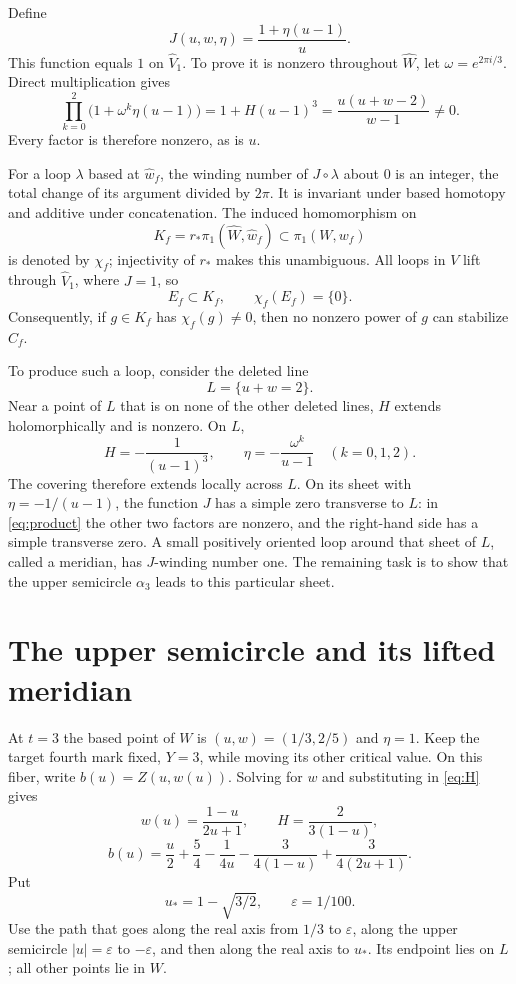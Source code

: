 \documentclass[11pt]{article}
\theoremstyle{remark}
\begin{document}
Define
\begin{equation}\label{eq:J}
 J(u,w,\eta)=\frac{1+\eta(u-1)}u.
\end{equation}
This function equals $1$ on $\widehat V_1$. To prove it is nonzero throughout $\widehat W$, let $\omega=e^{2\pi i/3}$. Direct multiplication gives
\begin{equation}\label{eq:product}
 \prod_{k=0}^2\bigl(1+\omega^k\eta(u-1)\bigr)
 =1+H(u-1)^3=\frac{u(u+w-2)}{w-1}\ne0.
\end{equation}
Every factor is therefore nonzero, as is $u$.

For a loop $\lambda$ based at $\widehat w_f$, the winding number of $J\circ\lambda$ about $0$ is an integer, the total change of its argument divided by $2\pi$. It is invariant under based homotopy and additive under concatenation. The induced homomorphism on
\[
 K_f=r_*\pi_1(\widehat W,\widehat w_f)\subset\pi_1(W,w_f)
\]
is denoted by $\chi_f$; injectivity of $r_*$ makes this unambiguous. All loops in $V$ lift through $\widehat V_1$, where $J=1$, so
\begin{equation}\label{eq:vanishes}
 E_f\subset K_f,\qquad \chi_f(E_f)=\{0\}.
\end{equation}
Consequently, if $g\in K_f$ has $\chi_f(g)\ne0$, then no nonzero power of $g$ can stabilize $C_f$.

To produce such a loop, consider the deleted line
\[
 L=\{u+w=2\}.
\]
Near a point of $L$ that is on none of the other deleted lines, $H$ extends holomorphically and is nonzero. On $L$,
\[
 H=-\frac1{(u-1)^3},\qquad
 \eta=-\frac{\omega^k}{u-1}\quad(k=0,1,2).
\]
The covering therefore extends locally across $L$. On its sheet with $\eta=-1/(u-1)$, the function $J$ has a simple zero transverse to $L$: in \eqref{eq:product} the other two factors are nonzero, and the right-hand side has a simple transverse zero. A small positively oriented loop around that sheet of $L$, called a meridian, has $J$-winding number one. The remaining task is to show that the upper semicircle $\alpha_3$ leads to this particular sheet.

\section{The upper semicircle and its lifted meridian}
At $t=3$ the based point of $W$ is $(u,w)=(1/3,2/5)$ and $\eta=1$. Keep the target fourth mark fixed, $Y=3$, while moving its other critical value. On this fiber, write $b(u)=Z(u,w(u))$. Solving for $w$ and substituting in \eqref{eq:H} gives
\begin{equation}\label{eq:fiber}
 w(u)=\frac{1-u}{2u+1},\qquad H=\frac2{3(1-u)},
\end{equation}
\begin{equation}\label{eq:bu}
 b(u)=\frac u2+\frac54-\frac1{4u}
             -\frac3{4(1-u)}+\frac3{4(2u+1)}.
\end{equation}
Put
\[
 u_*=1-\sqrt{3/2},\qquad \varepsilon=1/100.
\]
Use the path that goes along the real axis from $1/3$ to $\varepsilon$, along the upper semicircle $|u|=\varepsilon$ to $-\varepsilon$, and then along the real axis to $u_*$. Its endpoint lies on $L$; all other points lie in $W$.
\end{document}
